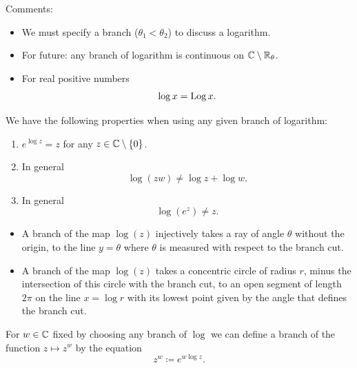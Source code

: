 \documentclass[10pt, a4paper]{article}
\begin{document}
Comments:
\begin{itemize}
    \item We must specify a branch
    ($\theta_1 < \theta_2$)
    to discuss a logarithm.

    \item For future:
    any branch of logarithm is continuous on $\mathbb{C} \setminus \mathbb{R}_{\theta}$.

    \item For real positive numbers
    \[
    \log{x} = \operatorname{Log}{x}.
    \]
\end{itemize}

\begin{lemma}
    We have the following properties when using any given branch of logarithm:
    \begin{enumerate}[label = (\roman*)]
        \item $e ^ {\log{z}} = z$ for any $z \in \mathbb{C} \setminus \{0\}$.

        \item In general
        \[
        \log(zw) \neq \log{z} + \log{w}.
        \]

        \item In general
        \[
        \log(e ^ z) \neq z.
        \]
    \end{enumerate}
\end{lemma}

\begin{lemma}\phantom{}
    \begin{itemize}
        \item A branch of the map $\log(z)$ injectively takes a ray of angle $\theta$ without the origin,
        to the line $y = \theta$ where $\theta$ is measured with respect to the branch cut.
    
        \item A branch of the map $\log(z)$ takes a concentric circle of radius $r$,
        minus the intersection of this circle with the branch cut,
        to an open segment of length $2\pi$ on the line $x = \log{r}$ with its lowest point given by the angle that defines the branch cut.
    \end{itemize}
\end{lemma}

\begin{definition}
    For $w \in \mathbb{C}$ fixed by choosing any branch of $\log$ we can define a branch of the function $z \mapsto z ^ w$ by the equation
    \[
    z ^ w \coloneqq e ^ {w\log{z}}.
    \]
\end{definition}
\end{document}
